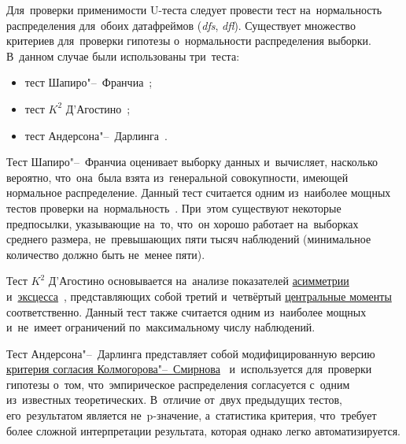 \documentclass[]{scrartcl}
\begin{document}
Для~проверки применимости U-теста следует провести тест на~нормальность распределения для~обоих датафреймов (\textit{dfs}, \textit{dfl}). Существует множество критериев для~проверки гипотезы о~нормальности распределения выборки. В~данном случае были использованы три~теста:
\begin{itemize}
	\item тест Шапиро"--~Франчиа~\cite{Shapiro-Wilk-test};
	\item тест ${\textstyle K^{2}}$ Д'Агостино~\cite{Agostino-test};
	\item тест Андерсона"--~Дарлинга~\cite{Anderson-Darling-test}.
\end{itemize}
Тест Шапиро"--~Франчиа оценивает выборку данных и~вычисляет, насколько вероятно, что~она~была взята из~генеральной совокупности, имеющей нормальное распределение. Данный тест считается одним из~наиболее мощных тестов проверки на~нормальность~\cite{Kobzarq-prikl-mathstat}. При~этом существуют некоторые предпосылки, указывающие на~то, что~он хорошо работает на~выборках среднего размера, не~превышающих пяти тысяч наблюдений (минимальное количество должно быть не~менее пяти). 

Тест ${\textstyle K^{2}}$ Д'Агостино основывается на~анализе показателей \href{https://en.wikipedia.org/wiki/Skewness}{асимметрии}~\cite{Wiki:skewness} и~\href{https://en.wikipedia.org/wiki/Kurtosis}{эксцесса}~\cite{Wiki:kurtosis}, представляющих собой третий и~четвёртый \href{https://en.wikipedia.org/wiki/Central_moment}{центральные моменты}~\cite{Wiki:central-moment} соответственно. Данный тест также считается одним из~наиболее мощных и~не~имеет ограничений по~максимальному числу наблюдений.

Тест Андерсона"--~Дарлинга представляет собой модифицированную версию \href{Wiki:Kolmogorow-Smirnow-test}{критерия согласия Колмогорова"--~Смирнова}~\cite{Wiki:Kolmogorow-Smirnow-test} и~используется для~проверки гипотезы о~том, что~эмпирическое распределения согласуется с~одним из~известных теоретических. В~отличие от~двух предыдущих тестов, его~результатом является не~p-значение, а~статистика критерия, что~требует более сложной интерпретации результата, которая однако легко автоматизируется.
\end{document}
